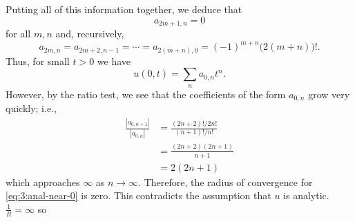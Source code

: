 \begin{solution*}
  Putting all of this information together, we deduce that
  \[
    a_{2m+1,n}=0
  \]
  for all \(m,n\) and, recursively,
  \[
    a_{2m,n}=a_{2m+2,n-1}=\dotsb=
    a_{2(m+n),0}=(-1)^{m+n}\bigl(2(m+n)\bigr)!.
  \]
  Thus, for small \(t>0\) we have
  \begin{equation}
    \label{eq:3:anal-near-0}
    u(0,t)=\sum_{n}a_{0,n}t^n.
  \end{equation}
  However, by the ratio test, we see that the coefficients of the form
  \(a_{0,n}\) grow very quickly; i.e.,
  \begin{align*}
    \frac{|a_{0,n+1}|}{|a_{0,n}|}
    &=\frac{(2n+2)!/2n!}{(n+1)!/n!}\\
    &=\frac{(2n+2)(2n+1)}{n+1}\\
    &=2(2n+1)
  \end{align*}
  which approaches \(\infty\) as \(n\to\infty\). Therefore, the radius of
  convergence for \eqref{eq:3:anal-near-0} is zero. This contradicts the
  assumption that \(u\) is analytic.
  \(\frac{1}{R}=\infty\) so
\end{solution*}

